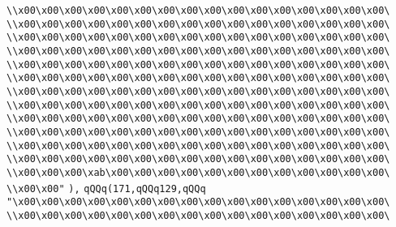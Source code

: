 \verb|\\x00\x00\x00\x00\x00\x00\x00\x00\x00\x00\x00\x00\x00\x00\x00\x00\|\newline
\verb|\\x00\x00\x00\x00\x00\x00\x00\x00\x00\x00\x00\x00\x00\x00\x00\x00\|\newline
\verb|\\x00\x00\x00\x00\x00\x00\x00\x00\x00\x00\x00\x00\x00\x00\x00\x00\|\newline
\verb|\\x00\x00\x00\x00\x00\x00\x00\x00\x00\x00\x00\x00\x00\x00\x00\x00\|\newline
\verb|\\x00\x00\x00\x00\x00\x00\x00\x00\x00\x00\x00\x00\x00\x00\x00\x00\|\newline
\verb|\\x00\x00\x00\x00\x00\x00\x00\x00\x00\x00\x00\x00\x00\x00\x00\x00\|\newline
\verb|\\x00\x00\x00\x00\x00\x00\x00\x00\x00\x00\x00\x00\x00\x00\x00\x00\|\newline
\verb|\\x00\x00\x00\x00\x00\x00\x00\x00\x00\x00\x00\x00\x00\x00\x00\x00\|\newline
\verb|\\x00\x00\x00\x00\x00\x00\x00\x00\x00\x00\x00\x00\x00\x00\x00\x00\|\newline
\verb|\\x00\x00\x00\x00\x00\x00\x00\x00\x00\x00\x00\x00\x00\x00\x00\x00\|\newline
\verb|\\x00\x00\x00\x00\x00\x00\x00\x00\x00\x00\x00\x00\x00\x00\x00\x00\|\newline
\verb|\\x00\x00\x00\x00\x00\x00\x00\x00\x00\x00\x00\x00\x00\x00\x00\x00\|\newline
\verb|\\x00\x00\x00\xab\x00\x00\x00\x00\x00\x00\x00\x00\x00\x00\x00\x00\|\newline
\verb|\\x00\x00"|\newline
\verb|),|\newline
\verb|qQQq(171,qQQq129,qQQq|\newline
\verb|"\x00\x00\x00\x00\x00\x00\x00\x00\x00\x00\x00\x00\x00\x00\x00\x00\|\newline
\verb|\\x00\x00\x00\x00\x00\x00\x00\x00\x00\x00\x00\x00\x00\x00\x00\x00\|\newline
